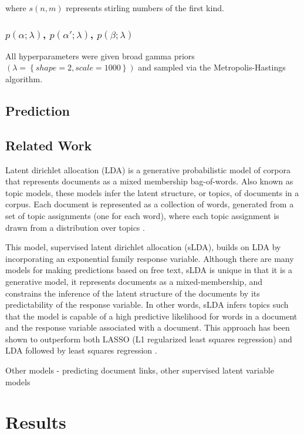 \documentclass{article}
\begin{document}
where $s\left(n,m\right)$ represents stirling numbers of the first
kind.


\subsubsection{$p\left(\alpha;\lambda\right)$, $p\left(\alpha';\lambda\right)$,
$p\left(\beta;\lambda\right)$}

All hyperparameters were given broad gamma priors $\left(\lambda=\left\{ shape=2,scale=1000\right\} \right)$
and sampled via the Metropolis-Hastings algorithm.


\subsection{Prediction}


\subsection{Related Work}

Latent dirichlet allocation (LDA) is a generative probabilistic model
of corpora that represents documents as a mixed membership bag-of-words.
Also known as topic models, these models infer the latent structure,
or topics, of documents in a corpus. Each document is represented
as a collection of words, generated from a set of topic assignments
(one for each word), where each topic assignment is drawn from a distribution
over topics \citep{Blei2003}.

This model, supervised latent dirichlet allocation (sLDA), builds
on LDA by incorporating an exponential family response variable. Although
there are many models for making predictions based on free text, sLDA
is unique in that it is a generative model, it represents documents
as a mixed-membership, and constrains the inference of the latent
structure of the documents by its predictability of the response variable.
In other words, sLDA infers topics such that the model is capable
of a high predictive likelihood for words in a document and the response
variable associated with a document. This approach has been shown
to outperform both LASSO (L1 regularized least squares regression)
and LDA followed by least squares regression \citep{BleiMcAuliffe2008}.

Other models - predicting document links, other supervised latent
variable models



\section{Results}
\end{document}
